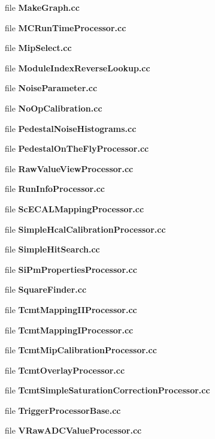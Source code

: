 \begin{DoxyCompactItemize}
\item 
file {\bfseries MakeGraph.cc}
\item 
file {\bfseries MCRunTimeProcessor.cc}
\item 
file {\bfseries MipSelect.cc}
\item 
file {\bfseries ModuleIndexReverseLookup.cc}
\item 
file {\bfseries NoiseParameter.cc}
\item 
file {\bfseries NoOpCalibration.cc}
\item 
file {\bfseries PedestalNoiseHistograms.cc}
\item 
file {\bfseries PedestalOnTheFlyProcessor.cc}
\item 
file {\bfseries RawValueViewProcessor.cc}
\item 
file {\bfseries RunInfoProcessor.cc}
\item 
file {\bfseries ScECALMappingProcessor.cc}
\item 
file {\bfseries SimpleHcalCalibrationProcessor.cc}
\item 
file {\bfseries SimpleHitSearch.cc}
\item 
file {\bfseries SiPmPropertiesProcessor.cc}
\item 
file {\bfseries SquareFinder.cc}
\item 
file {\bfseries TcmtMappingIIProcessor.cc}
\item 
file {\bfseries TcmtMappingIProcessor.cc}
\item 
file {\bfseries TcmtMipCalibrationProcessor.cc}
\item 
file {\bfseries TcmtOverlayProcessor.cc}
\item 
file {\bfseries TcmtSimpleSaturationCorrectionProcessor.cc}
\item 
file {\bfseries TriggerProcessorBase.cc}
\item 
file {\bfseries VRawADCValueProcessor.cc}
\end{DoxyCompactItemize}
